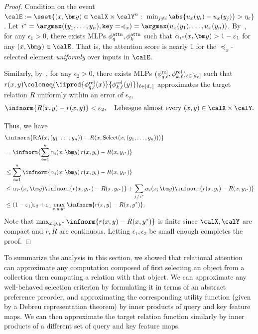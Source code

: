 \begin{proof}
  Condition on the event $\calE := \sset{(x, \y) \in \calX \times \calY^n \,\colon\, \min_{j \neq i} \abs{u_x(y_i) - u_x(y_j)} > \eta_\epsilon}$. Let $i^* = \argmax(\ys, \mathtt{key} = \preceq_x) = \argmax(u_x(y_1), \ldots, u_x(y_n))$. By~\citep[Theorem 5.1]{altabaaApproximationRelationFunctions2024}, for any $\epsilon_1 > 0$, there exists MLPs $\phi_q^{\mathrm{attn}}, \phi_k^{\mathrm{attn}}$ such that $\alpha_{i^*}(x, \y) > 1 - \epsilon_1$ for any $(x, \y) \in \calE$. That is, the attention score is nearly $1$ for the $\preceq_x$-selected element \textit{uniformly} over inputs in $\calE$.

  Similarly, by~\citep[Theorem 3.1]{altabaaApproximationRelationFunctions2024}, for any $\epsilon_2 > 0$, there exists MLPs $(\phi_{q, \ell}^{\mathrm{rel}}, \phi_{k, \ell}^{\mathrm{rel}})_{\ell \in [d_r]}$ such that $r(x, y) \coloneq (\iiprod{\phiqrell{\ell}(x)}{\phikrell{\ell}(y)})_{\ell \in [d_r]}$ approximates the target relation $R$ uniformly within an error of $\epsilon_2$,
  \begin{equation*}
    \infnorm{R(x, y) - r(x, y)} < \epsilon_2, \quad \text{Lebesgue almost every } (x, y) \in \calX \times \calY.
  \end{equation*}

  Thus, we have
  \begin{align*}
    &\infnorm{\RA(x, \ys) - R(x, \mathrm{Select}(x, \ys))} \\
    &= \infnorm{\sum_{i=1}^{n} \alpha_i(x; \y) \,r(x, y_i) - R(x, y_{i^*})} \\
    &\leq \sum_{i=1}^{n} \infnorm{\alpha_i(x; \y) \,r(x, y_i) - R(x, y_{i^*})} \\
    &\leq \alpha_{i^*}(x, \y) \infnorm{r(x, y_{i^*}) - R(x, y_{i^*})} + \sum_{j \neq i^*} \alpha_i(x; \y) \infnorm{r(x, y_i) - R(x, y_{i^*})}\\
    &\leq (1 - \epsilon_1) \epsilon_2 + \epsilon_1 \max_{x, y, y^*} \infnorm{r(x, y) - R(x, y^{*})}.
  \end{align*}
  Note that $\max_{x, y, y^*} \infnorm{r(x, y) - R(x, y^*)}$ is finite since $\calX, \calY$ are compact and $r, R$ are continuous. Letting $\epsilon_1, \epsilon_2$ be small enough completes the proof.
\end{proof}

To summarize the analysis in this section, we showed that relational attention can approximate any computation composed of first selecting an object from a collection then computing a relation with that object. We can approximate any well-behaved selection criterion by formulating it in terms of an abstract preference preorder, and approximating the corresponding utility function (given by a Debreu representation theorem) by inner products of query and key feature maps. We can then approximate the target relation function similarly by inner products of a different set of query and key feature maps.

